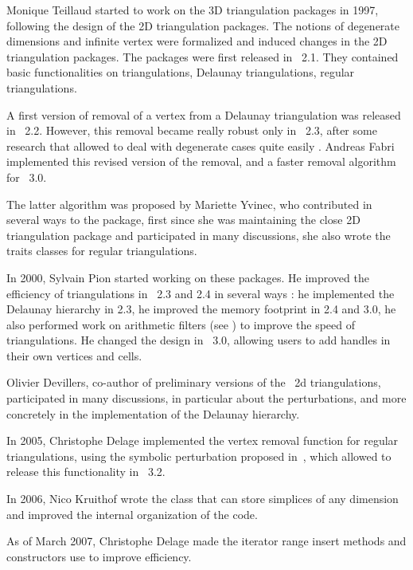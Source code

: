 Monique Teillaud started to work on the 3D triangulation packages in
1997, following the design of the 2D triangulation packages. The
notions of degenerate dimensions and infinite vertex were formalized
\cite{t-tdtc-99} and induced changes in the 2D triangulation
packages. The packages were first released in \cgal\ 2.1. They contained
basic functionalities on triangulations, Delaunay triangulations,
regular triangulations.

A first version of removal of a vertex from a Delaunay triangulation
was released in \cgal\ 2.2. However, this removal became really robust
only in \cgal\ 2.3, after some research that allowed to deal with
degenerate cases quite easily \cite{cgal:dt-pvr3d-03}. Andreas Fabri
implemented this revised version of the removal, and a faster removal
algorithm for \cgal\ 3.0. 

The latter algorithm was proposed by Mariette Yvinec, who contributed
in several ways to the package, first since she was maintaining the
close 2D triangulation package and participated in many discussions,
she also wrote the traits classes for regular triangulations.

In 2000, Sylvain Pion started working on these packages.  He improved
the efficiency of triangulations in \cgal\ 2.3 and 2.4 in several ways
\cite{cgal:bdpty-tc-02}: he implemented the Delaunay hierarchy
\cite{cgal:d-dh-02} in 2.3, he improved the memory footprint in 2.4
and 3.0, he also performed work on arithmetic filters
\cite{cgal:dp-eegpd-03} (see ) to improve
the speed of triangulations.  He changed the design in \cgal\ 3.0,
allowing users to add handles in their own vertices and cells.

Olivier Devillers, co-author of preliminary versions of the \cgal\ 2d
triangulations, participated in many discussions, in particular about
the perturbations, and more concretely in the implementation of the
Delaunay hierarchy. 

In 2005, Christophe Delage implemented the vertex removal function for
regular triangulations, using the symbolic perturbation proposed
in~\cite{cgal:dt-pvrdr-06}, which allowed to release this
functionality in \cgal\ 3.2.

In 2006, Nico Kruithof wrote the  class
that can store simplices of any dimension and improved the internal 
organization of the code.

As of March 2007, Christophe Delage made the iterator range insert methods and
constructors use  to improve efficiency.

